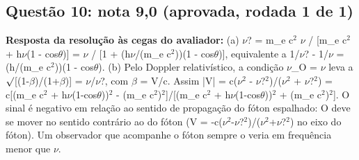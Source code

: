 \documentclass{article}%
\begin{document}
\subsection*{Questão 10: nota 9,0 (aprovada, rodada 1 de 1)}%
\textbf{Resposta da resolução às cegas do avaliador:} (a) $\nu$? = m\_e c$^2$ $\nu$ / {[}m\_e c$^2$ + h$\nu$(1 - cos$\theta$){]} = $\nu$ / {[}1 + (h$\nu$/(m\_e c$^2$))(1 - cos$\theta$){]}, equivalente a 1/$\nu$? - 1/$\nu$ = (h/(m\_e c$^2$))(1 - cos$\theta$).\newline%
\newline%
(b) Pelo Doppler relativístico, a condição $\nu$\_O = $\nu$ leva a $\surd${[}(1-$\beta$)/(1+$\beta$){]} = $\nu$/$\nu$?, com $\beta$ = V/c. Assim |V| = c($\nu$$^2$ - $\nu$?$^2$)/($\nu$$^2$ + $\nu$?$^2$) = c{[}(m\_e c$^2$ + h$\nu$(1-cos$\theta$))$^2$ - (m\_e c$^2$)$^2${]}/{[}(m\_e c$^2$ + h$\nu$(1-cos$\theta$))$^2$ + (m\_e c$^2$)$^2${]}. O sinal é negativo em relação ao sentido de propagação do fóton espalhado: O deve se mover no sentido contrário ao do fóton (V = -c($\nu$$^2$-$\nu$?$^2$)/($\nu$$^2$+$\nu$?$^2$) no eixo do fóton). Um observador que acompanhe o fóton sempre o veria em frequência menor que $\nu$.\par %
\end{document}
